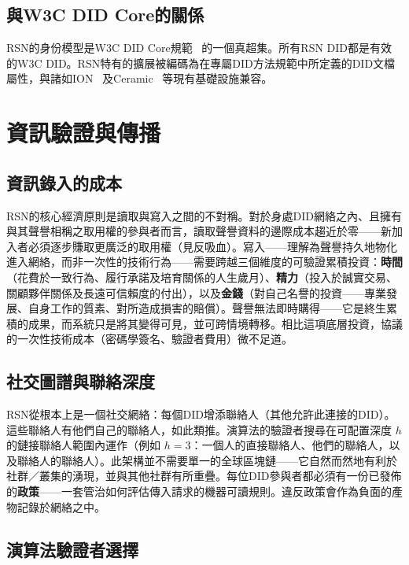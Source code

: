 \documentclass[11pt,a4paper,twocolumn]{article}
\begin{document}
\subsection{與W3C DID Core的關係}

RSN的身份模型是W3C DID Core規範~\cite{did2022} 的一個真超集。所有RSN DID都是有效的W3C DID。RSN特有的擴展被編碼為在專屬DID方法規範中所定義的DID文檔屬性，與諸如ION~\cite{buchner2021} 及Ceramic~\cite{ceramic2023} 等現有基礎設施兼容。

\section{資訊驗證與傳播}

\subsection{資訊錄入的成本}

RSN的核心經濟原則是讀取與寫入之間的不對稱。對於身處DID網絡之內、且擁有與其聲譽相稱之取用權的參與者而言，讀取聲譽資料的邊際成本趨近於零——新加入者必須逐步賺取更廣泛的取用權（見反吸血）。寫入——理解為聲譽持久地物化進入網絡，而非一次性的技術行為——需要跨越三個維度的可驗證累積投資：\textbf{時間}（花費於一致行為、履行承諾及培育關係的人生歲月）、\textbf{精力}（投入於誠實交易、關顧夥伴關係及長遠可信賴度的付出），以及\textbf{金錢}（對自己名譽的投資——專業發展、自身工作的質素、對所造成損害的賠償）。聲譽無法即時購得——它是終生累積的成果，而系統只是將其變得可見，並可跨情境轉移。相比這項底層投資，協議的一次性技術成本（密碼學簽名、驗證者費用）微不足道。

\subsection{社交圖譜與聯絡深度}

RSN從根本上是一個社交網絡：每個DID增添聯絡人（其他允許此連接的DID）。這些聯絡人有他們自己的聯絡人，如此類推。演算法的驗證者搜尋在可配置深度 $h$ 的鏈接聯絡人範圍內運作（例如 $h=3$：一個人的直接聯絡人、他們的聯絡人，以及聯絡人的聯絡人）。此架構並不需要單一的全球區塊鏈——它自然而然地有利於社群／叢集的湧現，並與其他社群有所重疊。每位DID參與者都必須有一份已發佈的\textbf{政策}——一套管治如何評估傳入請求的機器可讀規則。違反政策會作為負面的產物記錄於網絡之中。

\subsection{演算法驗證者選擇}
\end{document}
